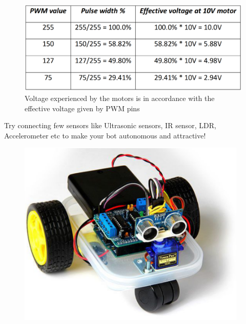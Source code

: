 \begin{figure}
    \centering
    \includegraphics{Tables/Motor_Driver/motor_voltage.png}
    \caption[Voltage at motors]{Voltage experienced by the motors is in accordance with the effective voltage given by \ac{PWM} pins}
    \label{fig:motor_volt}
\end{figure}

Try connecting few sensors like Ultrasonic sensors, \ac{IR} sensor, \ac{LDR}, Accelerometer etc to make your bot autonomous and attractive!
\begin{figure}
    \centering
    \includegraphics[width=4.3in]{Images/Motor_Driver/sensor_bot.png}
\end{figure}